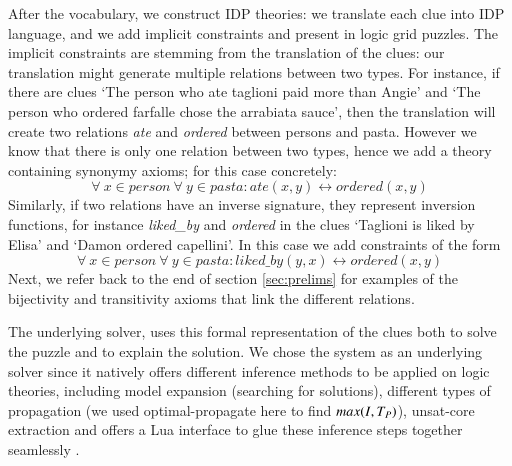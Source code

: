 After the vocabulary, we construct IDP theories: we translate each clue into IDP language, and  we add implicit constraints and present in logic grid puzzles.
The implicit constraints are stemming from the translation of the clues: our translation might generate multiple relations between two types. 
For instance, if there are clues `The person who ate taglioni paid more than Angie' and `The person who ordered farfalle chose the arrabiata sauce', then the translation will create two relations \textit{ate} and \textit{ordered} between persons and pasta.
However we know that there is only one relation between two types, hence we add a theory containing synonymy axioms; for this case concretely:
\[ \forall \ x \in person \ \forall \ y \in pasta : ate(x, y) \leftrightarrow ordered(x, y) \]
Similarly, if two relations have an inverse signature, they represent inversion functions, for instance \textit{liked\_by} and \textit{ordered} in the clues `Taglioni is liked by Elisa' and `Damon ordered capellini'. 
In this case we add constraints of the form 
\[ \forall \ x \in person \ \forall \ y \in pasta : liked\_by(y, x) \leftrightarrow ordered(x, y)\]
Next, we refer back to the end of section \ref{sec:prelims} for examples of the bijectivity and transitivity axioms that link the different relations.

The underlying solver, \idp\cite{IDP} uses this formal representation of the clues both to solve the puzzle and to explain the solution. 
We chose the \idp system as an underlying solver since it natively offers different inference methods to be applied on logic theories, including model expansion (searching for solutions), different types of propagation (we used optimal-propagate here to find $max(I,T_P)$), unsat-core extraction and offers a Lua \cite{ierusalimschy1996lua} interface to glue these inference steps together seamlessly \cite{IDP}.


